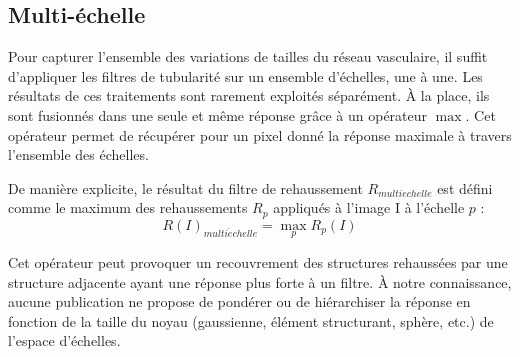 \subsection{Multi-échelle}
  \label{sec:EA:rehaussement:echelle:multiScale}
   Pour capturer l'ensemble des variations de tailles du réseau vasculaire, il suffit d'appliquer les filtres de tubularité sur un ensemble d'échelles, une à une. Les résultats de ces traitements sont rarement exploités séparément. À la place, ils sont fusionnés dans une seule et même réponse grâce à un opérateur $\max$. Cet opérateur permet de récupérer pour un pixel donné la réponse maximale à travers l'ensemble des échelles.

  De manière explicite, le résultat du filtre de rehaussement $R_{multi echelle}$ est défini comme le maximum des rehaussements $R_{p}$ appliqués à l'image I à l'échelle $p$ :
  \begin{equation}
    R(I)_{multi \acute echelle} = \max_{p}R_{p}(I) 
  \end{equation}
  
  Cet opérateur peut provoquer un recouvrement des structures rehaussées par une structure adjacente ayant une réponse plus forte à un filtre. À notre connaissance, aucune publication ne propose de pondérer ou de hiérarchiser la réponse en fonction de la taille du noyau (gaussienne, élément structurant, sphère, etc.) de l'espace d'échelles.

